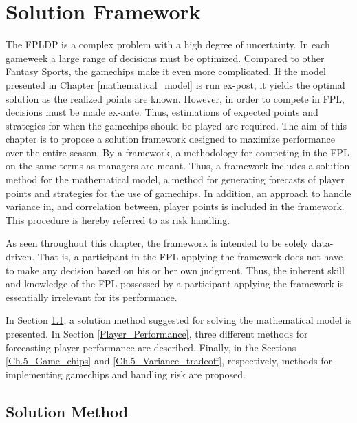 

\chapter{Solution Framework} \label{chapter_solution_approach}

The FPLDP is a complex problem with a high degree of uncertainty. In each gameweek a large range of decisions must be optimized. Compared to other Fantasy Sports, the gamechips make it even more complicated. If the model presented in Chapter \ref{mathematical_model} is run ex-post, it yields the optimal solution as the realized points are known. However, in order to compete in FPL, decisions must be made ex-ante. Thus, estimations of expected points and strategies for when the gamechips should be played are required. The aim of this chapter is to propose a solution framework designed to maximize performance over the entire season. By a framework, a methodology for competing in the FPL on the same terms as managers are meant. Thus, a framework includes a solution method for the mathematical model, a method for generating forecasts of player points and strategies for the use of gamechips. In addition, an approach to handle variance in, and correlation between, player points is included in the framework. This procedure is hereby referred to as risk handling.

\newpar

As seen throughout this chapter, the framework is intended to be solely data-driven. That is, a participant in the FPL applying the framework does not have to make any decision based on his or her own judgment. Thus, the inherent skill and knowledge of the FPL possessed by a participant applying the framework is essentially irrelevant for its performance.

\newpar

In Section \ref{section_solution_method}, a solution method suggested for solving the mathematical model is presented. In Section \ref{Player_Performance}, three different methods for forecasting player performance are described. Finally, in the Sections \ref{Ch.5_Game_chips} and \ref{Ch.5_Variance_tradeoff}, respectively, methods for implementing gamechips and handling risk are proposed.


\section{Solution Method}\label{section_solution_method}

